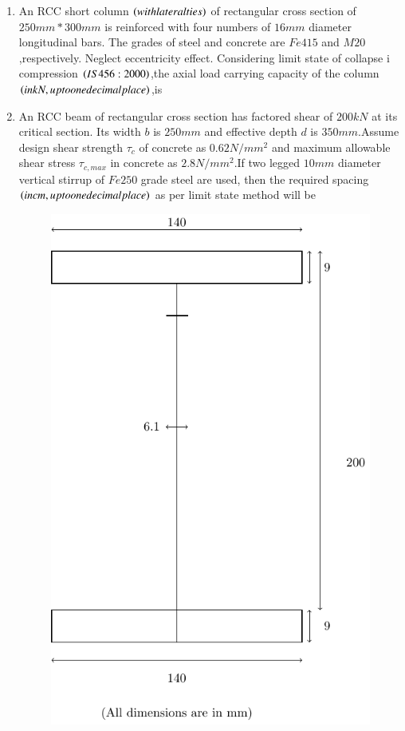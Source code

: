 \documentclass[journal]{IEEEtran}
\begin{document}
\begin{enumerate}
    \item An RCC short column $\left(with lateral ties\right)$ of rectangular cross section of $250 mm * 300 mm$ is reinforced with four numbers of $16 mm$ diameter longitudinal bars. The grades of steel and concrete are $Fe415$ and $M20$,respectively. Neglect eccentricity effect. Considering limit state of collapse i  compression $\left(IS 456 : 2000\right)$,the axial load carrying capacity of the column $\left(in kN, up to one decimal place\right)$,is \\
 \item An  RCC beam of rectangular cross section has factored shear of $200 kN$ at its critical section. Its width $b$ is $250 mm$ and effective depth $d$ is $350 mm$.Assume design shear strength $\tau_{c}$ of concrete as $0.62 N/mm^{2}$ and maximum allowable shear stress $\tau_{c,max}$ in concrete as $2.8 N/mm^{2}$.If two legged $10 mm$ diameter vertical stirrup of $Fe250$ grade steel are used, then the required spacing $\left(in cm,up to one decimal place\right)$ as per limit state method will be\\
 \begin{figure}[h!]
         \centering
        \includegraphics[width=0.7\linewidth]{figure/fig1/fig1.pdf}
		\caption{}
        \label{stemplot}


\end{figure}
\end{enumerate}
\end{document}
